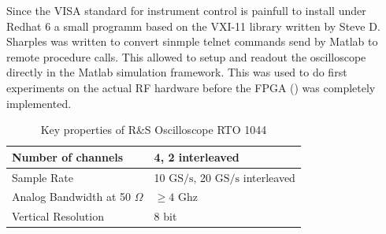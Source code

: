 Since the VISA standard for instrument control is painfull to install under
Redhat 6 a small programm based on the VXI-11 library written by
Steve D. Sharples 
was written to convert sinmple telnet commands send by Matlab
to remote procedure calls. This allowed to setup and readout the oscilloscope
directly in the Matlab simulation framework. This was used to do first experiments
on the actual \gls{RF} hardware before the \gls{FPGA} () was
completely implemented. \\

\begin{table}[h]
  \centering
  \begin{tabular}{|l|l|}
    \hline
    Number of channels & 4, 2 interleaved \\ \hline
    Sample Rate & 10 $\text{GS}/\text{s}$, 20 $\text{GS}/\text{s}$ interleaved \\ \hline
    Analog Bandwidth at 50 $\Omega$ & $\geq 4$ Ghz \\ \hline
    Vertical Resolution & 8 bit \\ \hline
  \end{tabular}
  \caption{Key properties of R\&S Oscilloscope RTO 1044}
  \label{tab:awg}
\end{table}
